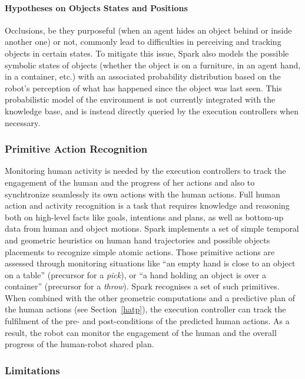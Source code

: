 \documentclass[preprint,3p,times]{elsarticle}
\begin{document}
\paragraph{Hypotheses on Objects States and Positions}

Occlusions, be they purposeful (when an agent hides an object behind or inside
another one) or not, commonly lead to difficulties in perceiving and tracking
objects in certain states. To mitigate this issue, {\sc Spark} also models the
possible symbolic states of objects (whether the object is on a furniture, in an
agent hand, in a container, etc.) with an associated probability distribution
based on the robot's perception of what has happened since the object was last
seen.  This probabilistic model of the environment is not currently integrated
with the knowledge base, and is instead directly queried by the execution
controllers when necessary.

\subsubsection{Primitive Action Recognition}

Monitoring human activity is needed by the execution controllers to track the
engagement of the human and the progress of her actions and also to synchtronize seamlessly
its own actions with the human actions. Full human action
and activity recognition is a task that requires knowledge and reasoning both on
high-level facts like goals, intentions and plans, as well as bottom-up data
from human and object motions. {\sc Spark} implements a set of simple temporal and
geometric heuristics on human hand trajectories and possible objects placements
to recognize simple atomic actions. Those primitive actions are assessed through
monitoring situations like ``an empty hand is close to an object on a table''
(precursor for a \emph{pick}), or ``a hand holding an object is over a
container'' (precursor for a \emph{throw}).  {\sc Spark} recognises a set of
such primitives. When combined with the other geometric computations and a predictive
plan of the human actions (see Section~\ref{hatp}), the execution controller can
track the fulfilment of the pre- and post-conditions of the predicted human
actions. As a result, the robot can monitor the engagement of the human and the
overall progress of the human-robot shared plan.

\subsubsection{Limitations}
\end{document}

